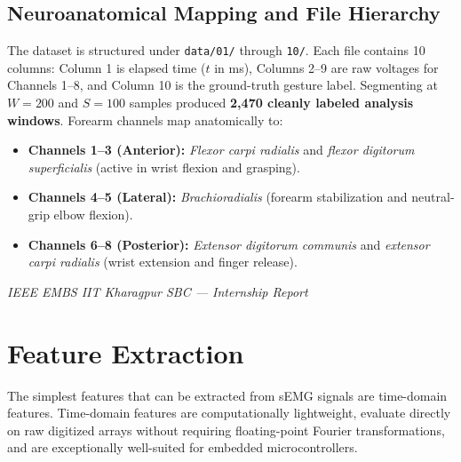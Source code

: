 \documentclass[12pt,a4paper]{article}
\begin{document}
\subsection{Neuroanatomical Mapping and File Hierarchy}
The dataset is structured under \texttt{data/01/} through \texttt{10/}. Each file contains 10 columns: Column 1 is elapsed time ($t$ in ms), Columns 2--9 are raw voltages for Channels 1--8, and Column 10 is the ground-truth gesture label. Segmenting at $W=200$ and $S=100$ samples produced \textbf{2,470 cleanly labeled analysis windows}. Forearm channels map anatomically to:
\begin{itemize}[leftmargin=*]
    \item \textbf{Channels 1--3 (Anterior):} \textit{Flexor carpi radialis} and \textit{flexor digitorum superficialis} (active in wrist flexion and grasping).
    \item \textbf{Channels 4--5 (Lateral):} \textit{Brachioradialis} (forearm stabilization and neutral-grip elbow flexion).
    \item \textbf{Channels 6--8 (Posterior):} \textit{Extensor digitorum communis} and \textit{extensor carpi radialis} (wrist extension and finger release).
\end{itemize}

\vfill
\begin{center}
    \footnotesize\textit{IEEE EMBS IIT Kharagpur SBC --- Internship Report}
\end{center}

\newpage
\section{Feature Extraction}\label{sec:features}

The simplest features that can be extracted from sEMG signals are time-domain features. Time-domain features are computationally lightweight, evaluate directly on raw digitized arrays without requiring floating-point Fourier transformations, and are exceptionally well-suited for embedded microcontrollers.
\end{document}
